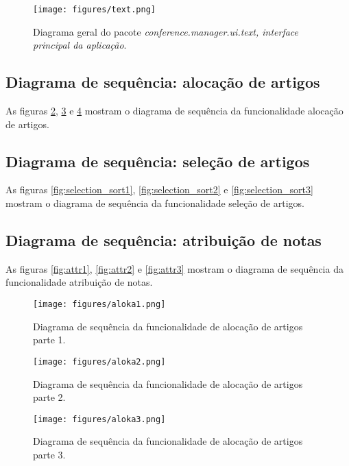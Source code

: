 \documentclass[a4paper, 12pt]{article}
\begin{document}
\begin{figure}[h]
\centering
\texttt{[image: figures/text.png]}
\caption{Diagrama geral do pacote \emph{conference.manager.ui.text, interface principal da aplicação}.}
\label{fig:ui}
\end{figure}

\FloatBarrier


\subsection{Diagrama de sequência: alocação de artigos}
As figuras \ref{fig:aloka1}, \ref{fig:aloka2} e \ref{fig:aloka3} mostram o diagrama de sequência da funcionalidade alocação de artigos.

\subsection{Diagrama de sequência: seleção de artigos}
As figuras \ref{fig:selection_sort1}, \ref{fig:selection_sort2} e \ref{fig:selection_sort3} mostram o diagrama de sequência da funcionalidade seleção de artigos.

\subsection{Diagrama de sequência: atribuição de notas}
As figuras \ref{fig:attr1}, \ref{fig:attr2} e \ref{fig:attr3} mostram o diagrama de sequência da funcionalidade atribuição de notas.

\begin{figure}[!f] 
\centering
\texttt{[image: figures/aloka1.png]}
\caption{Diagrama de sequência da funcionalidade de alocação de artigos parte 1.}
\label{fig:aloka1}
\end{figure}

\begin{figure}[!f] 
\centering
\texttt{[image: figures/aloka2.png]}
\caption{Diagrama de sequência da funcionalidade de alocação de artigos parte 2.}
\label{fig:aloka2}
\end{figure}

\begin{figure}[!f] 
\centering
\texttt{[image: figures/aloka3.png]}
\caption{Diagrama de sequência da funcionalidade de alocação de artigos parte 3.}
\label{fig:aloka3}
\end{figure}
\end{document}
